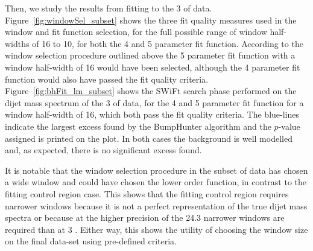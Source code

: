 Then, we study the results from fitting to the 3 \ifb{}  of data.
Figure~\ref{fig:windowSel_subset} shows the three fit quality measures used in the window and fit function selection,
for the full possible range of window half-widths of 16 to 10, for both the 4 and 5 parameter fit function.
According to the window selection procedure outlined above the 5 parameter fit function with a window half-width of 16 would have been selected,
although the 4 parameter fit function would also have passed the fit quality criteria.
Figure~\ref{fig:bhFit_lm_subset} shows the SWiFt search phase performed on the dijet mass spectrum of the 3 \ifb{} of data,
for the 4 and 5 parameter fit function for a window half-width of 16, which both pass the fit quality criteria.
The blue-lines indicate the largest excess found by the {\sc BumpHunter} algorithm and the \mbox{$p$-value} assigned is printed on the plot. 
In both cases the background is well modelled and, as expected, there is no significant excess found.

It is notable that the window selection procedure in the subset of data has chosen a wide window and
could have chosen the lower order function, in contrast to the fitting control region case. 
This shows that the fitting control region requires narrower windows because it is not a perfect representation
of the true dijet mass spectra
or because at the higher precision of the 24.3 \ifb{} narrower windows are required than at 3 \ifb{}.
Either way, this shows the utility of choosing the window size on the final data-set using pre-defined criteria.

